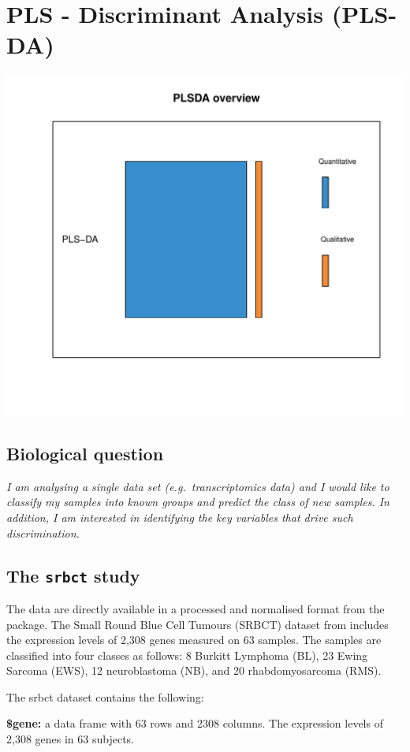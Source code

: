 \documentclass[]{book}
\begin{document}
\hypertarget{plsda}{%
\chapter{PLS - Discriminant Analysis (PLS-DA)}\label{plsda}}

\begin{center}\includegraphics[width=0.5\linewidth]{Figures/04-overview-PLSDA-1} \end{center}

\hypertarget{biological-question-2}{%
\section{Biological question}\label{biological-question-2}}

{
\emph{I am analysing a single data set (e.g.~transcriptomics data) and I would like to classify my samples into known groups and predict the class of new samples. In addition, I am interested in identifying the key variables that drive such discrimination.}
}

\hypertarget{the-srbct-study}{%
\section{\texorpdfstring{The \texttt{srbct} study}{The srbct study}}\label{the-srbct-study}}

The data are directly available in a processed and normalised format from the package. The Small Round Blue Cell Tumours (SRBCT) dataset from \citep{Kha01} includes the expression levels of 2,308 genes measured on 63 samples. The samples are classified into four classes as follows: 8 Burkitt Lymphoma (BL), 23 Ewing Sarcoma (EWS), 12 neuroblastoma (NB), and 20 rhabdomyosarcoma (RMS).

The srbct dataset contains the following:

\textbf{\$gene:} a data frame with 63 rows and 2308 columns. The expression levels of 2,308 genes in 63 subjects.
\end{document}
